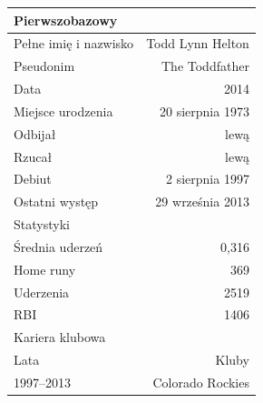 \documentclass[a4paper,12pt]{article}
\begin{document}
\begin{tabular}{||lr||}
\hline
 Pierwszobazowy&\\
\hline
Pełne imię i nazwisko & Todd Lynn Helton\\
\hline
 Pseudonim &  	The Toddfather\\
\hline
 Data  & 2014\\
\hline
 Miejsce urodzenia&	20 sierpnia 1973\\
\hline
 Odbijał &  	lewą\\
\hline
 Rzucał &  	lewą\\
\hline
 Debiut &  	2 sierpnia 1997\\
\hline
 Ostatni występ & 29 września 2013\\
\hline
 Statystyki&\\
\hline
 Średnia uderzeń& 0,316\\
\hline
 Home runy&  	369\\
\hline
Uderzenia&  	2519\\
\hline
RBI&  	 	1406\\
\hline
Kariera klubowa&\\
\hline
Lata&Kluby\\
\hline
1997–2013&Colorado Rockies\\
\hline
\end{tabular}
\end{document}
